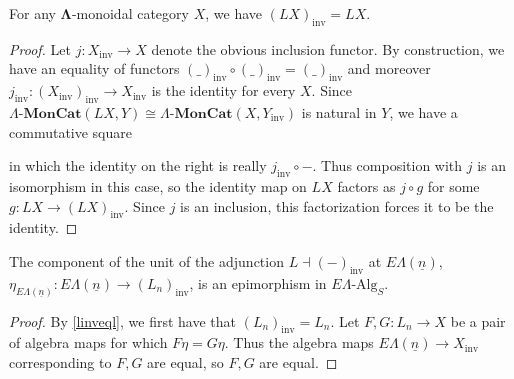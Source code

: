 \documentclass{amsbook} %
\newcommand{\mb}{\mathbf}
\newcommand{\id}{\textrm{id}}
\newcommand{\ML}{\mathbf{\Lambda}}
\newcommand{\lmc}{\Lambda\mbox{-}\mb{MonCat}}
\numberwithin{section}{chapter}
\begin{document}
\begin{prop} \label{linveql} For any $\ML$-monoidal category $X$, we have $(LX)_{\mathrm{inv}} = LX$.
\end{prop}
\begin{proof}
Let $j \colon  X_{\mathrm{inv}} \rightarrow X$ denote the obvious inclusion functor. By construction, we have an equality of functors $(\_)_{\mathrm{inv}} \circ (\_)_{\mathrm{inv}} = (\_)_{\mathrm{inv}}$ and moreover $j_\mathrm{inv} \colon  (X_\mathrm{inv})_\mathrm{inv} \rightarrow X_\mathrm{inv}$ is the identity for every $X$. Since $\lmc(LX , Y)\cong \lmc(X, Y_{\mathrm{inv}})$ is natural in $Y$, we have a commutative square
\begin{center}
    \end{center}
in which the identity on the right is really $j_{\mathrm{inv}} \circ -$. Thus composition with $j$ is an isomorphism in this case, so the identity map on $LX$ factors as $j \circ g$ for some $g \colon  LX \rightarrow (LX)_{\mathrm{inv}}$. Since $j$ is an inclusion, this factorization forces it to be the identity.
\end{proof}

\begin{cor} \label{epi} The component of the unit of the adjunction $L \dashv (-)_{\mathrm{inv}}$ at $E\Lambda(\underline{n})$,  $\eta_{E\Lambda(\underline{n})} \colon  E\Lambda(\underline{n}) \rightarrow (L_n)_{\mathrm{inv}}$, is an epimorphism in $E\Lambda\mbox{-}\mathrm{Alg}_S$.
\end{cor}
\begin{proof}
By \cref{linveql}, we first have that $(L_n)_{\mathrm{inv}} = L_n$. Let $F,G \colon  L_n \rightarrow X$ be a pair of algebra maps for which $F \eta = G \eta$. Thus the algebra maps $E\Lambda(\underline{n}) \rightarrow X_{\mathrm{inv}}$ corresponding to $F, G$ are equal, so $F,G$ are equal.
\end{proof}
\end{document}

